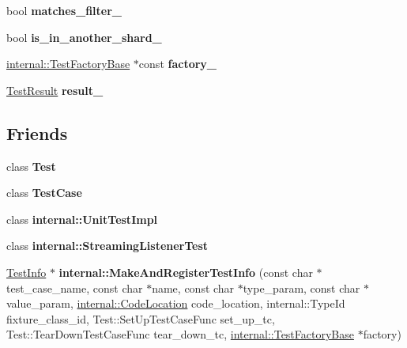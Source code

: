 \begin{DoxyCompactItemize}
bool {\bfseries matches\+\_\+filter\+\_\+}
\item 
\mbox{\label{classtesting_1_1_test_info_a7db5fe84e625c2d5b60544e15fbb75a3}} 
bool {\bfseries is\+\_\+in\+\_\+another\+\_\+shard\+\_\+}
\item 
\mbox{\label{classtesting_1_1_test_info_a6bf2422602b877c73f6eb169a63cfea8}} 
\mbox{\hyperlink{classtesting_1_1internal_1_1_test_factory_base}{internal\+::\+Test\+Factory\+Base}} $\ast$const {\bfseries factory\+\_\+}
\item 
\mbox{\label{classtesting_1_1_test_info_a108fd469897a8d4e5c4361947a5ed785}} 
\mbox{\hyperlink{classtesting_1_1_test_result}{Test\+Result}} {\bfseries result\+\_\+}
\end{DoxyCompactItemize}
\subsection*{Friends}
\begin{DoxyCompactItemize}
\item 
\mbox{\label{classtesting_1_1_test_info_a5b78b1c2e1fa07ffed92da365593eaa4}} 
class {\bfseries Test}
\item 
\mbox{\label{classtesting_1_1_test_info_aff779e55b06adfa7c0088bd10253f0f0}} 
class {\bfseries Test\+Case}
\item 
\mbox{\label{classtesting_1_1_test_info_acc0a5e7573fd6ae7ad1878613bb86853}} 
class {\bfseries internal\+::\+Unit\+Test\+Impl}
\item 
\mbox{\label{classtesting_1_1_test_info_adc037d188dab349a94868991955c9cd4}} 
class {\bfseries internal\+::\+Streaming\+Listener\+Test}
\item 
\mbox{\label{classtesting_1_1_test_info_a70ddf8a12d8c05f17429f6381abc8ace}} 
\mbox{\hyperlink{classtesting_1_1_test_info}{Test\+Info}} $\ast$ {\bfseries internal\+::\+Make\+And\+Register\+Test\+Info} (const char $\ast$test\+\_\+case\+\_\+name, const char $\ast$name, const char $\ast$type\+\_\+param, const char $\ast$value\+\_\+param, \mbox{\hyperlink{structtesting_1_1internal_1_1_code_location}{internal\+::\+Code\+Location}} code\+\_\+location, internal\+::\+Type\+Id fixture\+\_\+class\+\_\+id, Test\+::\+Set\+Up\+Test\+Case\+Func set\+\_\+up\+\_\+tc, Test\+::\+Tear\+Down\+Test\+Case\+Func tear\+\_\+down\+\_\+tc, \mbox{\hyperlink{classtesting_1_1internal_1_1_test_factory_base}{internal\+::\+Test\+Factory\+Base}} $\ast$factory)
\end{DoxyCompactItemize}


